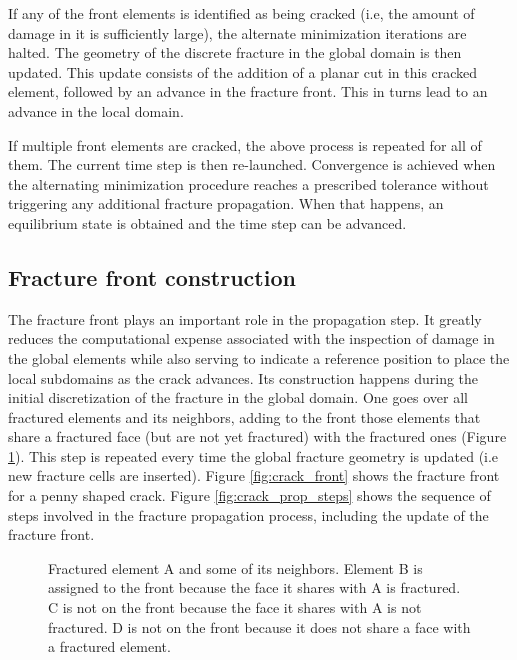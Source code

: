 If any of the front elements is identified as being cracked (i.e, the amount of damage in it is sufficiently large), the alternate minimization iterations are halted. The geometry of the discrete fracture in the global domain is then updated. This update consists of the addition of a planar cut in this cracked element, followed by an advance in the fracture front. This in turns lead to an advance in the local domain.

If multiple front elements are cracked, the above process is repeated for all of them. The current time step is then re-launched. Convergence is achieved when the alternating minimization procedure reaches a prescribed tolerance without triggering any additional fracture propagation. When that happens, an equilibrium state is obtained and the time step can be advanced.

\subsection{Fracture front construction}\label{sec:front}

The fracture front plays an important role in the propagation step. It greatly reduces the computational expense associated with the inspection of damage in the global elements while also serving to indicate a reference position to place the local subdomains as the crack advances. Its construction happens during the initial discretization of the fracture in the global domain. One goes over all fractured elements and its neighbors, adding to the front those elements that share a fractured face (but are not yet fractured) with the fractured ones (Figure \ref{fig:front_faces}). This step is repeated every time the global fracture geometry is updated (i.e new fracture cells are inserted). Figure \ref{fig:crack_front} shows the fracture front for a penny shaped crack. Figure \ref{fig:crack_prop_steps} shows the sequence of steps involved in the fracture propagation process, including the update of the fracture front.

\begin{figure}[h]
  \centering
  \caption{Fractured element A and some of its neighbors. Element B is assigned to the front because the face it shares with A is fractured. C is not on the front because the face it shares with A is not fractured. D is not on the front because it does not share a face with a fractured element. }
  \label{fig:front_faces}
\end{figure}


